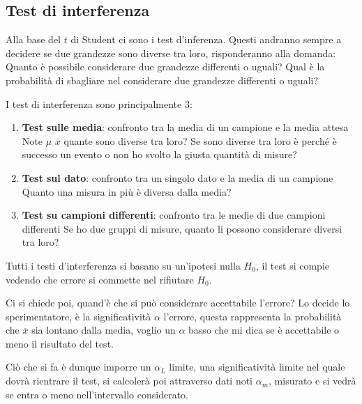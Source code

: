 \documentclass[a4paper, 15pt]{article}
\begin{document}
\subsection{Test di interferenza}
\begin{adjustwidth}{2in}{}	
	Alla base del $t$ di Student ci sono i test d'inferenza. Questi andranno sempre a decidere se due grandezze sono diverse tra loro, risponderanno alla domanda: Quanto è possibile considerare due grandezze differenti o uguali? Qual è la probabilità di sbagliare nel considerare due grandezze differenti o uguali? \newline 
	
	I test di interferenza sono principalmente 3: 
	\begin{enumerate}
		\item \textbf{Test sulle media}: confronto tra la media di un campione e la media attesa \newline
		Note $\mu$ $\overline{x}$ quante sono diverse tra loro? Se sono diverse tra loro è perché è successo un evento o non ho svolto la giusta quantità di misure? 
		
		\item \textbf{Test sul dato}: confronto tra un singolo dato e la media di un campione \newline
		Quanto una misura in più è diversa dalla media? 
		
		\item \textbf{Test su campioni differenti}: confronto tra le medie di due campioni differenti \newline 
		Se ho due gruppi di misure, quanto li possono considerare diversi tra loro? 
	\end{enumerate}
	Tutti i testi d'interferenza si basano su un'ipotesi nulla $H_0$, il test si compie vedendo che errore si commette nel rifiutare $H_0$. 
	
	Ci si chiede poi, quand'è che si può considerare accettabile l'errore? Lo decide lo sperimentatore, è la significatività $\alpha$ l'errore, questa rappresenta la probabilità che $\overline{x}$ sia lontano dalla media, voglio un $\alpha$ basso che mi dica se è accettabile o meno il risultato del test. 
	
	Ciò che si fa è dunque imporre un $\alpha_L$ limite, una significatività limite nel quale dovrà rientrare il test, si calcolerà poi attraverso dati noti $\alpha_m$, misurato e si vedrà se entra o meno nell'intervallo considerato. 	
\end{adjustwidth}
\newpage
\end{document}
